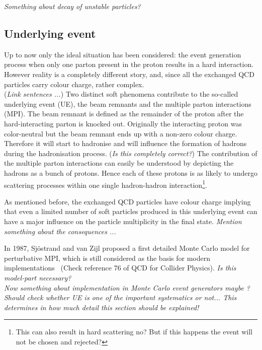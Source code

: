\textit{Something about decay of unstable particles?}

\subsection{Underlying event}%
Up to now only the ideal situation has been considered: the event generation process when only one parton present in the proton results in a hard interaction. However reality is a completely different story, and, since all the exchanged QCD particles carry colour charge, rather complex.\\
(\textit{Link sentences ...}) Two distinct soft phenomena contribute to the so-called underlying event (UE), the beam remnants and the multiple parton interactions (MPI). The beam remnant is defined as the remainder of the proton after the hard-interacting parton is knocked out. Originally the interacting proton was color-neutral but the beam remnant ends up with a non-zero colour charge. Therefore it will start to hadronise and will influence the formation of hadrons during the hadronisation process. (\textit{Is this completely correct?}) The contribution of the multiple parton interactions can easily be understood by depicting the hadrons as a bunch of protons. Hence each of these protons is as likely to undergo scattering processes within one single hadron-hadron interaction\footnote{This can also result in hard scattering no? But if this happens the event will not be chosen and rejected?}.

As mentioned before, the exchanged QCD particles have colour charge implying that even a limited number of soft particles produced in this underlying event can have a major influence on the particle multiplicity in the final state. 
\textit{Mention something about the consequences ...}

In 1987, Sj\"ostrand and van Zijl proposed a first detailed Monte Carlo model for perturbative MPI, which is still considered as the basis for modern implementations~\cite{SjostrandAndZijl} (Check reference 76 of QCD for Collider Physics). \textit{Is this model-part necessary?}\\
\textit{Now something about implementation in Monte Carlo event generators maybe ?}\\

\textit{Should check whether UE is one of the important systematics or not... This determines in how much detail this section should be explained!}

